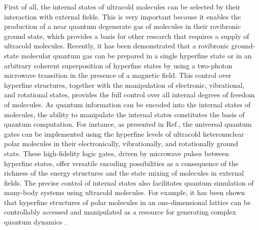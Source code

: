 First of all, the internal states of ultracold molecules can be selected by their interaction with  
external fields. This is very important because it enables the production of a near quantum degenerate gas of 
molecules in their rovibronic ground state\cite{ni2008, danzl2010}, which provides a basis for other research that 
requires a supply of  ultracold molecules. 
Recently, it has been demonstrated that a rovibronic ground-state molecular quantum gas  can be prepared in a single 
hyperfine state or in an arbitrary coherent superposition of hyperfine states\cite{ospelkaus2010} by using a two-photon
microwave transition in the presence of a magnetic field. This control over hyperfine structures, together with the 
manipulation of electronic, vibrational, and rotational states, provides the full control over all internal degrees of
freedom of molecules. As quantum information can be encoded 
into the internal states of molecules,  the ability to manipulate the internal states constitutes the basis of 
quantum computation. For instance, as presented in Ref.\cite{pellegrini2011}, the universal quantum gates can be 
implemented using the hyperfine levels of ultracold 
heteronuclear polar molecules in their electronically, vibrationally, and rotationally ground state. These high-fidelity 
logic gates, driven by microwave pulses between hyperfine states, offer versatile encoding possibilities as a 
consequence of the richness of the energy structures and the state mixing of molecules in external fields. The precise control of internal states also 
facilitates quantum simulation of many-body systems using ultracold molecules. For example, it has been shown that hyperfine structures of polar molecules in an one-dimensional 
lattice can be controllably accessed and manipulated as a resource for generating complex quantum dynamics
\cite{Carr2}.  

